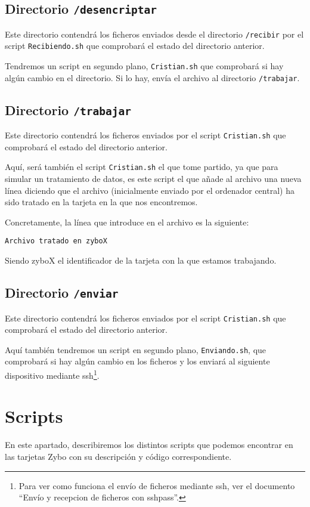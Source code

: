 \documentclass[12pt,letterpaper]{article}
\begin{document}
\subsection{Directorio \texttt{/desencriptar}}
Este directorio contendrá los ficheros enviados desde el directorio \texttt{/recibir} por el script \texttt{Recibiendo.sh} que comprobará el estado del directorio anterior.

Tendremos un script en segundo plano, \texttt{Cristian.sh} que comprobará si hay algún cambio en el directorio. Si lo hay, envía el archivo al directorio \texttt{/trabajar}.

\subsection{Directorio \texttt{/trabajar}}
Este directorio contendrá los ficheros enviados por el script \texttt{Cristian.sh} que comprobará el estado del directorio anterior.

Aquí, será también el script \texttt{Cristian.sh} el que tome partido, ya que para simular un tratamiento de datos, es este script el que añade al archivo una nueva línea diciendo que el archivo (inicialmente enviado por el ordenador central) ha sido tratado en la tarjeta en la que nos encontremos.

Concretamente, la línea que introduce en el archivo es la siguiente:
\begin{center}
	\texttt{Archivo tratado en zyboX}
\end{center}

Siendo zyboX el identificador de la tarjeta con la que estamos trabajando.

\subsection{Directorio \texttt{/enviar}}
Este directorio contendrá los ficheros enviados por el script \texttt{Cristian.sh} que comprobará el estado del directorio anterior.

Aquí también tendremos un script en segundo plano, \texttt{Enviando.sh}, que comprobará si hay algún cambio en los ficheros y los enviará al siguiente dispositivo mediante ssh\footnote{Para ver como funciona el envío de ficheros mediante ssh, ver el documento ``Envío y recepcion de ficheros con sshpass''.}.


\section{Scripts}
En este apartado, describiremos los distintos scripts que podemos encontrar en las tarjetas Zybo con su descripción y código correspondiente.
\end{document}
